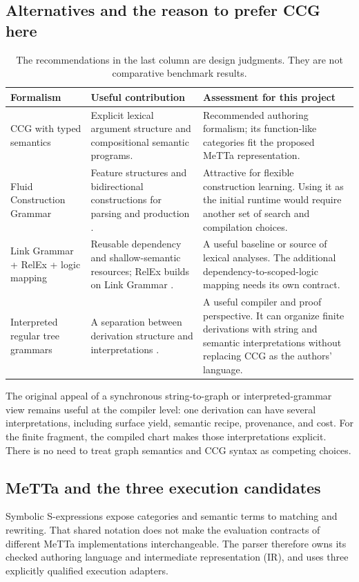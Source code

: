 \documentclass[11pt,a4paper]{article}
\begin{document}
\subsection{Alternatives and the reason to prefer CCG here}
\begin{table}[htbp]
\small
\begin{tabularx}{\textwidth}{L{29mm}YY}
\toprule
Formalism & Useful contribution & Assessment for this project \\
\midrule
CCG with typed semantics &
Explicit lexical argument structure and compositional semantic programs. &
Recommended authoring formalism; its function-like categories fit the
proposed MeTTa representation. \\
Fluid Construction Grammar &
Feature structures and bidirectional constructions for parsing and
production \cite{fcg}. &
Attractive for flexible construction learning. Using it as the initial
runtime would require another set of search and compilation choices. \\
Link Grammar + RelEx + logic mapping &
Reusable dependency and shallow-semantic resources; RelEx builds on
Link Grammar \cite{relex}. &
A useful baseline or source of lexical analyses. The additional
dependency-to-scoped-logic mapping needs its own contract. \\
Interpreted regular tree grammars &
A separation between derivation structure and interpretations
\cite{irtg}. &
A useful compiler and proof perspective. It can organize finite
derivations with string and semantic interpretations without replacing
CCG as the authors' language. \\
\bottomrule
\end{tabularx}
\caption{The recommendations in the last column are design judgments. They
are not comparative benchmark results.}
\end{table}

The original appeal of a synchronous string-to-graph or interpreted-grammar
view remains useful at the compiler level: one derivation can have several
interpretations, including surface yield, semantic recipe, provenance, and
cost. For the finite fragment, the compiled chart makes those interpretations
explicit. There is no need to treat graph semantics and CCG syntax as
competing choices.

\subsection{MeTTa and the three execution candidates}
Symbolic S-expressions expose categories and semantic terms to matching and
rewriting. That shared notation does not make the evaluation contracts of
different MeTTa implementations interchangeable. The parser therefore owns
its checked authoring language and intermediate representation (IR), and
uses three explicitly qualified execution adapters.
\end{document}
